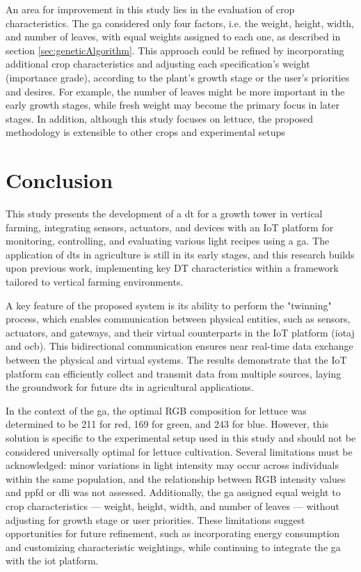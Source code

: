 \documentclass[preprint, review, 12pt]{elsarticle}
\begin{document}
An area for improvement in this study lies in the evaluation of crop characteristics. The \gls{ga} considered only four factors, i.e. the weight, height, width, and number of leaves, with equal weights assigned to each one, as described in section \ref{sec:geneticAlgorithm}. This approach could be refined by incorporating additional crop characteristics and adjusting each specification's weight (importance grade), according to the plant’s growth stage or the user’s priorities and desires. For example, the number of leaves might be more important in the early growth stages, while fresh weight may become the primary focus in later stages. In addition, although this study focuses on lettuce, the proposed methodology is extensible to other crops and experimental setups

\section{Conclusion}

This study presents the development of a \gls{dt} for a growth tower in vertical farming, integrating sensors, actuators, and devices with an IoT platform for monitoring, controlling, and evaluating various light recipes using a \gls{ga}. The application of \gls{dt}s in agriculture is still in its early stages, and this research builds upon previous work, implementing key DT characteristics within a framework tailored to vertical farming environments.

A key feature of the proposed system is its ability to perform the "twinning" process, which enables communication between physical entities, such as sensors, actuators, and gateways, and their virtual counterparts in the IoT platform (\gls{iotaj} and \gls{ocb}). This bidirectional communication ensures near real-time data exchange between the physical and virtual systems. The results demonstrate that the IoT platform can efficiently collect and transmit data from multiple sources, laying the groundwork for future \gls{dt}s in agricultural applications.

In the context of the \gls{ga}, the optimal RGB composition for lettuce was determined to be 211 for red, 169 for green, and 243 for blue. However, this solution is specific to the experimental setup used in this study and should not be considered universally optimal for lettuce cultivation. Several limitations must be acknowledged: minor variations in light intensity may occur across individuals within the same population, and the relationship between RGB intensity values and \gls{ppfd} or \gls{dli} was not assessed. Additionally, the \gls{ga} assigned equal weight to crop characteristics — weight, height, width, and number of leaves — without adjusting for growth stage or user priorities. These limitations suggest opportunities for future refinement, such as incorporating energy consumption and customizing characteristic weightings, while continuing to integrate the \gls{ga} with the \gls{iot} platform.
\end{document}
